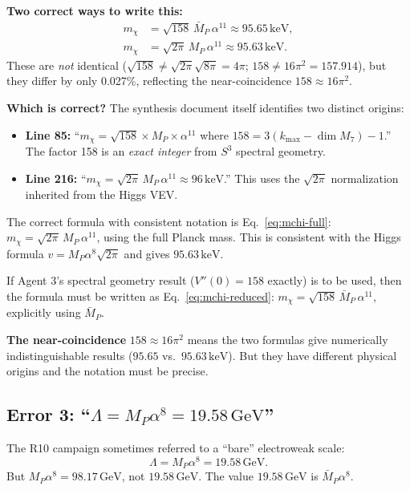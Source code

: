 \documentclass[11pt]{article}
\newcommand{\MP}{M_P}
\newcommand{\MPbar}{\bar{M}_P}
\newcommand{\GeV}{\,\mathrm{GeV}}
\newcommand{\keV}{\,\mathrm{keV}}
\begin{document}
\textbf{Two correct ways to write this:}
\begin{align}
  m_\chi &= \sqrt{158}\,\MPbar\,\alpha^{11} \approx 95.65\keV,
  \label{eq:mchi-reduced} \\
  m_\chi &= \sqrt{2\pi}\,\MP\,\alpha^{11} \approx 95.63\keV.
  \label{eq:mchi-full}
\end{align}
These are \textit{not} identical ($\sqrt{158} \neq \sqrt{2\pi}\sqrt{8\pi} = 4\pi$;
$158 \neq 16\pi^2 = 157.914$), but they differ by only 0.027\%, reflecting the
near-coincidence $158 \approx 16\pi^2$.

\textbf{Which is correct?}
The synthesis document itself identifies two distinct origins:
\begin{itemize}
\item \textbf{Line 85:} ``$m_\chi = \sqrt{158} \times \MP \times \alpha^{11}$
  where $158 = 3(k_\mathrm{max} - \dim M_7) - 1$.'' The factor 158 is an
  \textit{exact integer} from $S^3$ spectral geometry.
\item \textbf{Line 216:} ``$m_\chi = \sqrt{2\pi}\,\MP\,\alpha^{11} \approx 96\keV$.''
  This uses the $\sqrt{2\pi}$ normalization inherited from the Higgs VEV.
\end{itemize}

The correct formula with consistent notation is Eq.~\eqref{eq:mchi-full}:
$m_\chi = \sqrt{2\pi}\,\MP\,\alpha^{11}$, using the full Planck mass. This
is consistent with the Higgs formula $v = \MP\alpha^8\sqrt{2\pi}$ and gives
$95.63\keV$.

If Agent 3's spectral geometry result ($V''(0) = 158$ exactly) is to be used,
then the formula must be written as Eq.~\eqref{eq:mchi-reduced}:
$m_\chi = \sqrt{158}\,\MPbar\,\alpha^{11}$, explicitly using $\MPbar$.

\textbf{The near-coincidence} $158 \approx 16\pi^2$ means the two formulas
give numerically indistinguishable results ($95.65$ vs.\ $95.63\keV$).
But they have different physical origins and the notation must be precise.

\subsection{Error 3: ``$\Lambda = \MP\alpha^8 = 19.58\GeV$''}

The R10 campaign sometimes referred to a ``bare'' electroweak scale:
\begin{equation}
  \Lambda = \MP\alpha^8 = 19.58\GeV.
\end{equation}
But $\MP\alpha^8 = 98.17\GeV$, not $19.58\GeV$.
The value $19.58\GeV$ is $\MPbar\alpha^8$.
\end{document}
